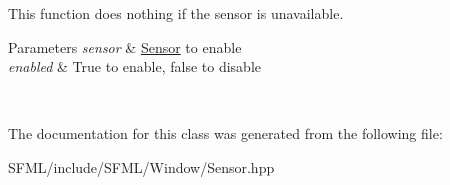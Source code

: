 This function does nothing if the sensor is unavailable.


\begin{DoxyParams}{Parameters}
{\em sensor} & \mbox{\hyperlink{classsf_1_1_sensor}{Sensor}} to enable \\
\hline
{\em enabled} & True to enable, false to disable \begin{DoxyVerb}\end{DoxyVerb}
 \\
\hline
\end{DoxyParams}


The documentation for this class was generated from the following file\+:\begin{DoxyCompactItemize}
\item 
S\+F\+M\+L/include/\+S\+F\+M\+L/\+Window/Sensor.\+hpp\end{DoxyCompactItemize}
